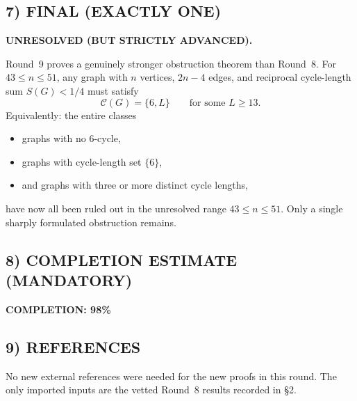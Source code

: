 \subsection*{7) FINAL (EXACTLY ONE)}

\textbf{UNRESOLVED (BUT STRICTLY ADVANCED).}

Round~9 proves a genuinely stronger obstruction theorem than Round~8.
For $43\le n\le 51$, any graph with $n$ vertices, $2n-4$ edges, and reciprocal cycle-length sum $S(G)<1/4$ must satisfy
\[
\mathcal C(G)=\{6,L\}
\qquad\text{for some }L\ge 13.
\]
Equivalently: the entire classes
\begin{itemize}
\item graphs with no $6$-cycle,
\item graphs with cycle-length set $\{6\}$,
\item and graphs with three or more distinct cycle lengths,
\end{itemize}
have now all been ruled out in the unresolved range $43\le n\le 51$.
Only a single sharply formulated obstruction remains.

\subsection*{8) COMPLETION ESTIMATE (MANDATORY)}

\textbf{COMPLETION: 98\%}

\subsection*{9) REFERENCES}

No new external references were needed for the new proofs in this round.
The only imported inputs are the vetted Round~8 results recorded in \S2.
